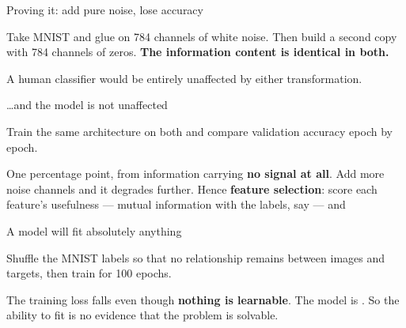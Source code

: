 \documentclass[aspectratio=169,11pt,t]{beamer}
\begin{document}
\begin{frame}[shrink=25]{Proving it: add pure noise, lose accuracy}
{\fontsize{9.4}{12.6}\selectfont\color{fg2}Take MNIST and glue on 784 channels of white noise. Then build a second copy with 784 channels of zeros. \textbf{The information content is identical in both.}\par}\vskip 4pt
{\fontsize{9.4}{12.6}\selectfont\color{fg2}A human classifier would be entirely unaffected by either transformation.\par}\vskip 4pt
\end{frame}

\begin{frame}[shrink=25]{\ldots{}and the model is not unaffected}
{\fontsize{9.4}{12.6}\selectfont\color{fg2}Train the same architecture on both and compare validation accuracy epoch by epoch.\par}\vskip 4pt
\begin{minipage}[t]{1.0\textwidth}
\end{minipage}%
\begin{iband}[signal]
One percentage point, from information carrying \textbf{no signal at all}. Add more noise channels and it degrades further. Hence \textbf{feature selection}: score each feature's usefulness --- mutual information with the labels, say --- and 
\end{iband}
\end{frame}

\begin{frame}[shrink=25]{A model will fit absolutely anything}
{\fontsize{9.4}{12.6}\selectfont\color{fg2}Shuffle the MNIST labels so that no relationship remains between images and targets, then train for 100 epochs.\par}\vskip 4pt
\begin{iband}[amber]
The training loss falls even though \textbf{nothing is learnable}. The model is . So the ability to fit is no evidence that the problem is solvable.
\end{iband}
\end{frame}
\end{document}
